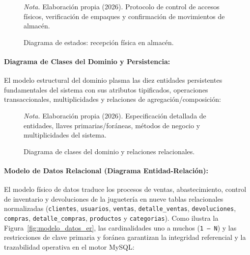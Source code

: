 \documentclass[12pt,a4paper]{article}
\begin{document}
\begin{figure}[H]
  \centering
  \caption{Diagrama de estados: recepci\'on f\'isica en almac\'en.}
  \label{fig:estado_recepcion}
  \resizebox{0.92\linewidth}{!}{}
  \par\vspace{0.2cm}
  {\raggedright \small \emph{Nota.} Elaboraci\'on propia (2026). Protocolo de control de accesos f\'isicos, verificaci\'on de empaques y confirmaci\'on de movimientos de almac\'en.\par}
\end{figure}

\paragraph{Diagrama de Clases del Dominio y Persistencia:}
El modelo estructural del dominio plasma las diez entidades persistentes fundamentales del sistema con sus atributos tipificados, operaciones transaccionales, multiplicidades y relaciones de agregaci\'on/composici\'on:

\begin{figure}[H]
  \centering
  \caption{Diagrama de clases del dominio y relaciones relacionales.}
  \label{fig:clases_dominio_lab10}
  \resizebox{0.92\linewidth}{!}{}
  \par\vspace{0.2cm}
  {\raggedright \small \emph{Nota.} Elaboraci\'on propia (2026). Especificaci\'on detallada de entidades, llaves primarias/for\'aneas, m\'etodos de negocio y multiplicidades del sistema.\par}
\end{figure}

\paragraph{Modelo de Datos Relacional (Diagrama Entidad-Relación):}
El modelo físico de datos traduce los procesos de ventas, abastecimiento, control de inventario y devoluciones de la juguetería en nueve tablas relacionales normalizadas (\texttt{clientes}, \texttt{usuarios}, \texttt{ventas}, \texttt{detalle\_ventas}, \texttt{devoluciones}, \texttt{compras}, \texttt{detalle\_compras}, \texttt{productos} y \texttt{categorias}). Como ilustra la Figura~\ref{fig:modelo_datos_er}, las cardinalidades uno a muchos (\texttt{1 -- N}) y las restricciones de clave primaria y foránea garantizan la integridad referencial y la trazabilidad operativa en el motor MySQL:
\end{document}
